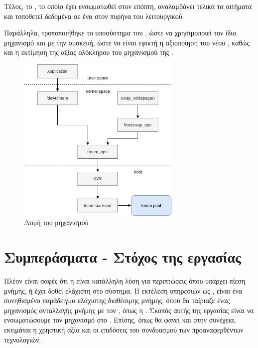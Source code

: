 Τέλος, το , το οποίο έχει ενσωματωθεί στον  επόπτη,
αναλαμβάνει τελικά τα αιτήματα και τοποθετεί δεδομένα σε ένα
 στον πυρήνα του  λειτουργικού.
\newline

Παράλληλα, τροποποιήθηκε το  υποσύστημα του ,
ώστε να χρησιμοποιεί τον ίδιο μηχανισμό και  με την 
συσκευή, ώστε να είναι εφικτή η αξιοποίηση του νέου ,
καθώς και η εκτίμηση της αξίας ολόκληρου του μηχανισμού της .

\begin{figure}[h]
  \includegraphics[width=0.7\textwidth]{pictures/utmemFlow.png}
  \caption{Δομή του  μηχανισμού}
  \label{fig:genUtmem}
\end{figure}

\section{Συμπεράσματα - Στόχος της εργασίας}

Πλέον είναι σαφές ότι η  είναι κατάλληλη λύση για περιπτώσεις
 όπου υπάρχει πίεση μνήμης, ή έχει δοθεί ελάχιστη στο
 σύστημα. Η εκτέλεση υπηρεσιών ως , είναι ένα συνηθισμένο
παράδειγμα ελάχιστης διαθέσιμης μνήμης, όπου θα ταίριαζε ένας μηχανισμός
ανταλλαγής μνήμης με τον , όπως η . Σκοπός αυτής της εργασίας
είναι να ενσωματώσουμε τον μηχανισμό  στο .
Επίσης, όπως θα φανεί και στην συνέχεια, εκτιμάται η χρηστική αξία και οι επιδόσεις του
συνδυασμού των προαναφερθέντων τεχνολογιών.
